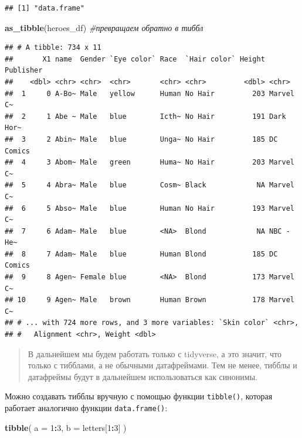 \documentclass[]{book}
\newenvironment{Shaded}{\begin{snugshade}}{\end{snugshade}}
\newcommand{\KeywordTok}[1]{\textcolor[rgb]{0.13,0.29,0.53}{\textbf{#1}}}
\newcommand{\DataTypeTok}[1]{\textcolor[rgb]{0.13,0.29,0.53}{#1}}
\newcommand{\DecValTok}[1]{\textcolor[rgb]{0.00,0.00,0.81}{#1}}
\newcommand{\CommentTok}[1]{\textcolor[rgb]{0.56,0.35,0.01}{\textit{#1}}}
\newcommand{\OperatorTok}[1]{\textcolor[rgb]{0.81,0.36,0.00}{\textbf{#1}}}
\newcommand{\NormalTok}[1]{#1}
\begin{document}
\begin{verbatim}
## [1] "data.frame"
\end{verbatim}

\begin{Shaded}
\begin{Highlighting}[]
\KeywordTok{as_tibble}\NormalTok{(heroes_df) }\CommentTok{#превращаем обратно в тиббл}
\end{Highlighting}
\end{Shaded}

\begin{verbatim}
## # A tibble: 734 x 11
##       X1 name  Gender `Eye color` Race  `Hair color` Height Publisher
##    <dbl> <chr> <chr>  <chr>       <chr> <chr>         <dbl> <chr>    
##  1     0 A-Bo~ Male   yellow      Human No Hair         203 Marvel C~
##  2     1 Abe ~ Male   blue        Icth~ No Hair         191 Dark Hor~
##  3     2 Abin~ Male   blue        Unga~ No Hair         185 DC Comics
##  4     3 Abom~ Male   green       Huma~ No Hair         203 Marvel C~
##  5     4 Abra~ Male   blue        Cosm~ Black            NA Marvel C~
##  6     5 Abso~ Male   blue        Human No Hair         193 Marvel C~
##  7     6 Adam~ Male   blue        <NA>  Blond            NA NBC - He~
##  8     7 Adam~ Male   blue        Human Blond           185 DC Comics
##  9     8 Agen~ Female blue        <NA>  Blond           173 Marvel C~
## 10     9 Agen~ Male   brown       Human Brown           178 Marvel C~
## # ... with 724 more rows, and 3 more variables: `Skin color` <chr>,
## #   Alignment <chr>, Weight <dbl>
\end{verbatim}

\begin{quote}
В дальнейшем мы будем работать только с tidyverse, а это значит, что
только с тибблами, а не обычными датафреймами. Тем не менее, тибблы и
датафреймы будут в дальнейшем использоваться как синонимы.
\end{quote}

Можно создавать тибблы вручную с помощью функции \texttt{tibble()},
которая работает аналогично функции \texttt{data.frame()}:

\begin{Shaded}
\begin{Highlighting}[]
\KeywordTok{tibble}\NormalTok{(}
  \DataTypeTok{a =} \DecValTok{1}\OperatorTok{:}\DecValTok{3}\NormalTok{,}
  \DataTypeTok{b =}\NormalTok{ letters[}\DecValTok{1}\OperatorTok{:}\DecValTok{3}\NormalTok{]}
\NormalTok{)}
\end{Highlighting}
\end{Shaded}
\end{document}
